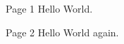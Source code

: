 \documentclass{article}
\begin{document}
Page 1
Hello World.

\begin{landscape}
\newpage
Page 2
Hello World again.
\end{landscape}
\end{document}
